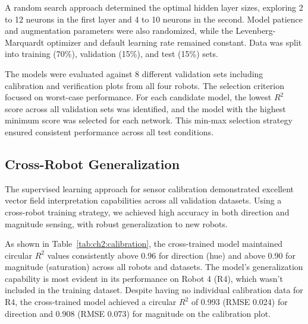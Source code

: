 A random search approach determined the optimal hidden layer sizes,
exploring 2 to 12 neurons in the first layer and 4 to 10 neurons in the
second. Model patience and augmentation parameters were also randomized,
while the Levenberg-Marquardt optimizer and default learning rate
remained constant. Data was split into training (70\%), validation
(15\%), and test (15\%) sets.

The models were evaluated against 8 different validation sets including
calibration and verification plots from all four robots. The selection
criterion focused on worst-case performance. For each candidate model,
the lowest $R^2$ score across all validation sets was identified, and the
model with the highest minimum score was selected for each network. This
min-max selection strategy ensured consistent performance across all test
conditions.

\subsection{Cross-Robot Generalization}

The supervised learning approach for sensor calibration demonstrated
excellent vector field interpretation capabilities across all validation
datasets. Using a cross-robot training strategy, we achieved high
accuracy in both direction and magnitude sensing, with robust
generalization to new robots.

As shown in Table~\ref{tab:ch2:calibration}, the cross-trained model
maintained circular $R^2$ values consistently above 0.96 for direction
(hue) and above 0.90 for magnitude (saturation) across all robots and
datasets. The model's generalization capability is most evident in its
performance on Robot 4 (R4), which wasn't included in the training
dataset. Despite having no individual calibration data for R4, the
cross-trained model achieved a circular $R^2$ of 0.993 (RMSE 0.024) for
direction and 0.908 (RMSE 0.073) for magnitude on the calibration plot.

